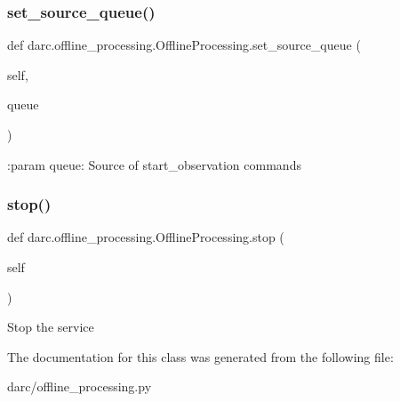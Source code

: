 \subsubsection{\texorpdfstring{set\_source\_queue()}{set\_source\_queue()}}
{\footnotesize\ttfamily def darc.\+offline\+\_\+processing.\+Offline\+Processing.\+set\+\_\+source\+\_\+queue (\begin{DoxyParamCaption}\item[{}]{self,  }\item[{}]{queue }\end{DoxyParamCaption})}

\begin{DoxyVerb}:param queue: Source of start_observation commands
\end{DoxyVerb}
 \mbox{\label{classdarc_1_1offline__processing_1_1_offline_processing_ab42c7966d7982b49acd82ad2a596b460}} 
\subsubsection{\texorpdfstring{stop()}{stop()}}
{\footnotesize\ttfamily def darc.\+offline\+\_\+processing.\+Offline\+Processing.\+stop (\begin{DoxyParamCaption}\item[{}]{self }\end{DoxyParamCaption})}

\begin{DoxyVerb}Stop the service
\end{DoxyVerb}
 

The documentation for this class was generated from the following file\+:\begin{DoxyCompactItemize}
\item 
darc/offline\+\_\+processing.\+py\end{DoxyCompactItemize}
